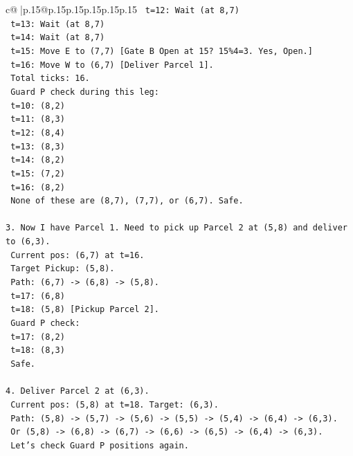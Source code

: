 \documentclass{article}
\begin{document}
{\begin{supertabular}{c@{$\;$}|p{.15\linewidth}@{}p{.15\linewidth}p{.15\linewidth}p{.15\linewidth}p{.15\linewidth}p{.15\linewidth}}
{{{\texttt{   t=12: Wait (at 8,7)} \\
\texttt{   t=13: Wait (at 8,7)} \\
\texttt{   t=14: Wait (at 8,7)} \\
\texttt{   t=15: Move E to (7,7) {[}Gate B Open at 15? 15\%4=3. Yes, Open.{]}} \\
\texttt{   t=16: Move W to (6,7) {[}Deliver Parcel 1{]}.} \\
\texttt{   Total ticks: 16.} \\
\texttt{   Guard P check during this leg:} \\
\texttt{   t=10: (8,2)} \\
\texttt{   t=11: (8,3)} \\
\texttt{   t=12: (8,4)} \\
\texttt{   t=13: (8,3)} \\
\texttt{   t=14: (8,2)} \\
\texttt{   t=15: (7,2)} \\
\texttt{   t=16: (8,2)} \\
\texttt{   None of these are (8,7), (7,7), or (6,7). Safe.} \\
\\ 
\texttt{3. Now I have Parcel 1. Need to pick up Parcel 2 at (5,8) and deliver to (6,3).} \\
\texttt{   Current pos: (6,7) at t=16.} \\
\texttt{   Target Pickup: (5,8).} \\
\texttt{   Path: (6,7) {-}> (6,8) {-}> (5,8).} \\
\texttt{   t=17: (6,8)} \\
\texttt{   t=18: (5,8) {[}Pickup Parcel 2{]}.} \\
\texttt{   Guard P check:} \\
\texttt{   t=17: (8,2)} \\
\texttt{   t=18: (8,3)} \\
\texttt{   Safe.} \\
\\ 
\texttt{4. Deliver Parcel 2 at (6,3).} \\
\texttt{   Current pos: (5,8) at t=18. Target: (6,3).} \\
\texttt{   Path: (5,8) {-}> (5,7) {-}> (5,6) {-}> (5,5) {-}> (5,4) {-}> (6,4) {-}> (6,3).} \\
\texttt{   Or (5,8) {-}> (6,8) {-}> (6,7) {-}> (6,6) {-}> (6,5) {-}> (6,4) {-}> (6,3).} \\
\texttt{   Let's check Guard P positions again.} \\
}}}
\end{supertabular}}
\end{document}
